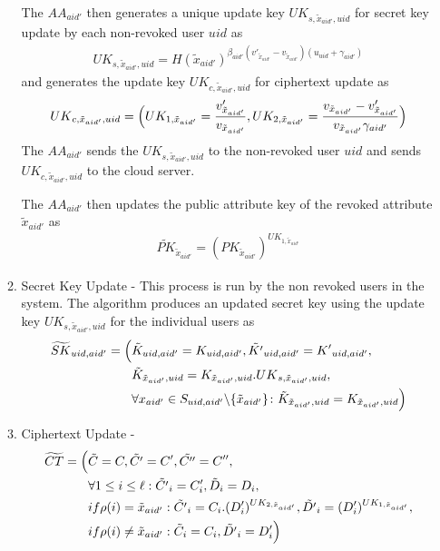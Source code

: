 \begin{enumerate}
\begin{enumerate}
		The $AA_{aid'}$ then generates a unique update key ${UK}_{s,\tilde{x}_{aid'},uid}$ for secret key update by each non-revoked user $uid$ as
		\begin{align*}
		{UK}_{s,\tilde{x}_{aid'},uid} = H(\tilde{x}_{aid'})^{\beta_{aid'}(v'_{\tilde{x}_{aid'}}-v_{\tilde{x}_{aid'}})(u_{uid}+\gamma_{aid'})}
		\end{align*}
		and generates the update key ${UK}_{c,\tilde{x}_{aid'},uid}$ for ciphertext update as
		\begin{align*}
		{UK}_{c,\tilde{x}_{aid'},uid} =\Bigl( UK_{1,\tilde{x}_{aid'}} = \frac{v'_{\tilde{x}_{aid'}}}{v_{\tilde{x}_{aid'}}}, UK_{2,\tilde{x}_{aid'}} = \frac{v_{\tilde{x}_{aid'}} - v'_{\tilde{x}_{aid'}}}{v_{\tilde{x}_{aid'}}\gamma_{aid'}} \Bigl)
		\end{align*}
		The $AA_{aid'}$ sends the ${UK}_{s,\tilde{x}_{aid'},uid}$ to the non-revoked user $uid$ and sends ${UK}_{c,\tilde{x}_{aid'},uid}$ to the cloud server.
		
		The $AA_{aid'}$ then updates the public attribute key of the revoked attribute $\tilde{x}_{aid'}$ as
		\begin{align*}
		\widetilde{PK}_{\tilde{x}_{aid'}} = ({PK}_{\tilde{x}_{aid'}})^{UK_{1,\tilde{x}_{aid'}}}
		\end{align*}
		
		
		\item Secret Key Update - This process is run by the non revoked users in the system. The algorithm produces an updated secret key using the update key ${UK}_{s,\tilde{x}_{aid'},uid}$ for the individual users as
		\begin{align*}
		\widetilde{SK}_{uid,aid'} = \Bigl(&\tilde{K}_{uid,aid'} = {K}_{uid,aid'},\tilde{K'}_{uid,aid'} = {K'}_{uid,aid'},\\
		&\tilde{K}_{\tilde{x}_{aid'},uid} = {K}_{\tilde{x}_{aid'},uid}.{UK}_{s,\tilde{x}_{aid'},uid},\\
		&\forall x_{aid'} \in S_{uid,aid'} \backslash \{ \tilde{x}_{aid'} \} \colon \tilde{K}_{\tilde{x}_{aid'},uid} = {K}_{\tilde{x}_{aid'},uid}  \Bigl) 
		\end{align*}
		
		\item Ciphertext Update - 
		\begin{align*}
		\widetilde{CT} = \Bigl(&\tilde{C} = C, \tilde{C'} = C', \tilde{C''} = C'',\\
		&\forall 1 \leq i \leq \ell: \tilde{C'}_{i} = C'_{i}, \tilde{D}_{i} = D_{i},\\
		&if \rho(i) = \tilde{x}_{aid'} : \tilde{C'}_{i} = C_{i} . (D'_{i})^{UK_{2,\tilde{x}_{aid'}}}, \tilde{D'}_{i} = (D'_{i})^{UK_{1,\tilde{x}_{aid'}}},\\
		&if \rho(i) \neq \tilde{x}_{aid'} : \tilde{C}_{i} = C_{i}, \tilde{D'}_{i} = D'_{i}\Bigl)
		\end{align*}
	\end{enumerate}
	
\end{enumerate}


